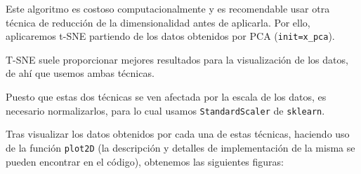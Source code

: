 \documentclass[a4]{article}
\begin{document}
Este algoritmo es costoso computacionalmente y es recomendable usar otra técnica de reducción de la dimensionalidad antes de aplicarla. Por ello, aplicaremos t-SNE partiendo de los datos obtenidos por PCA (\lstinline|init=x_pca|). 

T-SNE suele proporcionar mejores resultados para la visualización de los datos, de ahí que usemos ambas técnicas. 

Puesto que estas dos técnicas se ven afectada por la escala de los datos, es necesario normalizarlos, para lo cual usamos \lstinline|StandardScaler| de \lstinline|sklearn|. 

Tras visualizar los datos obtenidos por cada una de estas técnicas, haciendo uso de la función \lstinline|plot2D| (la descripción y detalles de implementación de la misma se pueden encontrar en el código), obtenemos las siguientes figuras:

\begin{figure}[H]
	\centering    
	\caption{}
	\label{fig:dimreduction}
\end{figure}
\end{document}
